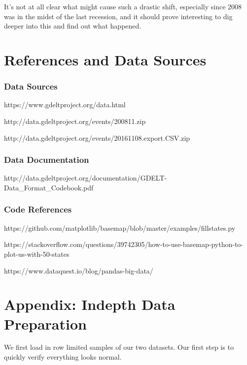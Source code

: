 \documentclass[11pt]{article}
\begin{document}
It's not at all clear what might cause such a drastic shift, especially
since 2008 was in the midst of the last recession, and it should prove
interesting to dig deeper into this and find out what happened.

    \section{References and Data Sources}\label{references-and-data-sources}

    \subsubsection{Data Sources}\label{data-sources}

https://www.gdeltproject.org/data.html

http://data.gdeltproject.org/events/200811.zip

http://data.gdeltproject.org/events/20161108.export.CSV.zip

\subsubsection{Data Documentation}\label{data-documentation}

http://data.gdeltproject.org/documentation/GDELT-Data\_Format\_Codebook.pdf

\subsubsection{Code References}\label{code-references}

https://github.com/matplotlib/basemap/blob/master/examples/fillstates.py

https://stackoverflow.com/questions/39742305/how-to-use-basemap-python-to-plot-us-with-50-states

https://www.dataquest.io/blog/pandas-big-data/

    \section{Appendix: Indepth Data
Preparation}\label{appendix-indepth-data-preparation}

    We first load in row limited samples of our two datasets. Our first step
is to quickly verify everything looks normal.
\end{document}

